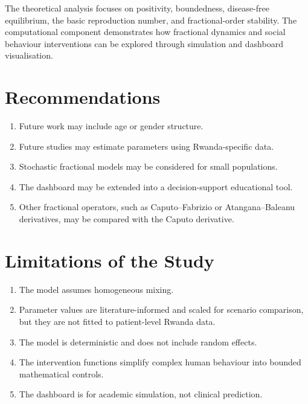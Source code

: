 \documentclass[12pt,a4paper,oneside]{report}
\begin{document}
The theoretical analysis focuses on positivity, boundedness, disease-free equilibrium, the basic reproduction number, and fractional-order stability. The computational component demonstrates how fractional dynamics and social behaviour interventions can be explored through simulation and dashboard visualisation.

\section{Recommendations}
\begin{enumerate}
  \item Future work may include age or gender structure.
  \item Future studies may estimate parameters using Rwanda-specific data.
  \item Stochastic fractional models may be considered for small populations.
  \item The dashboard may be extended into a decision-support educational tool.
  \item Other fractional operators, such as Caputo--Fabrizio or Atangana--Baleanu derivatives, may be compared with the Caputo derivative.
\end{enumerate}

\section{Limitations of the Study}
\begin{enumerate}
  \item The model assumes homogeneous mixing.
  \item Parameter values are literature-informed and scaled for scenario comparison, but they are not fitted to patient-level Rwanda data.
  \item The model is deterministic and does not include random effects.
  \item The intervention functions simplify complex human behaviour into bounded mathematical controls.
  \item The dashboard is for academic simulation, not clinical prediction.
\end{enumerate}
\end{document}
